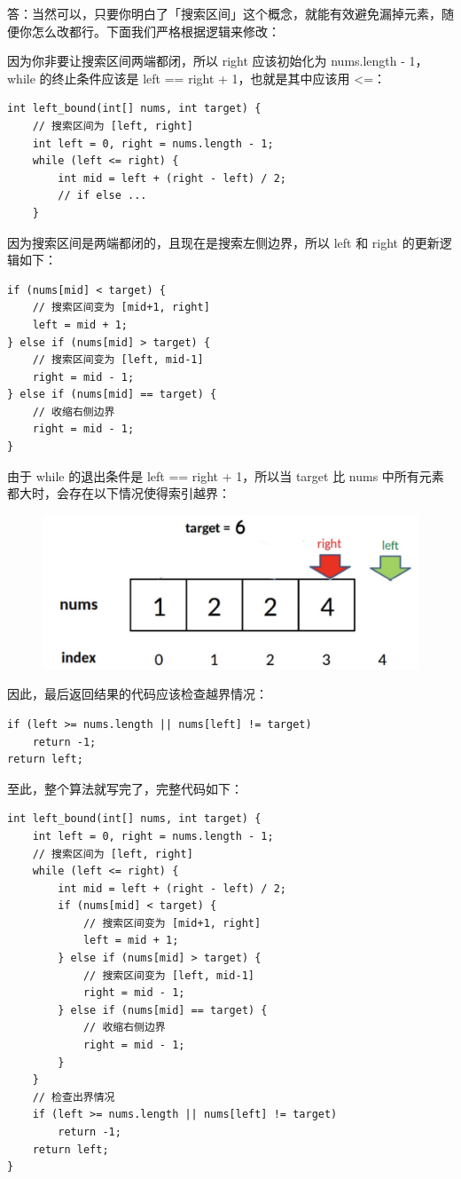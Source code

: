 \documentclass[12pt]{article}
\begin{document}
答：当然可以，只要你明白了「搜索区间」这个概念，就能有效避免漏掉元素，随便你怎么改都行。下面我们严格根据逻辑来修改：

因为你非要让搜索区间两端都闭，所以 right 应该初始化为 nums.length - 1，while 的终止条件应该是 left == right + 1，也就是其中应该用 <=：
\begin{lstlisting}
int left_bound(int[] nums, int target) {
    // 搜索区间为 [left, right]
    int left = 0, right = nums.length - 1;
    while (left <= right) {
        int mid = left + (right - left) / 2;
        // if else ...
    }
\end{lstlisting}

因为搜索区间是两端都闭的，且现在是搜索左侧边界，所以 left 和 right 的更新逻辑如下：
\begin{lstlisting}
if (nums[mid] < target) {
    // 搜索区间变为 [mid+1, right]
    left = mid + 1;
} else if (nums[mid] > target) {
    // 搜索区间变为 [left, mid-1]
    right = mid - 1;
} else if (nums[mid] == target) {
    // 收缩右侧边界
    right = mid - 1;
}
\end{lstlisting}

由于 while 的退出条件是 left == right + 1，所以当 target 比 nums 中所有元素都大时，会存在以下情况使得索引越界：
\begin{figure}[H]
    \centering
    \includegraphics[width=1\textwidth]{fig/Binary_Search_2.png}
\end{figure}

因此，最后返回结果的代码应该检查越界情况：
\begin{lstlisting}
if (left >= nums.length || nums[left] != target)
    return -1;
return left;
\end{lstlisting}

至此，整个算法就写完了，完整代码如下：
\begin{lstlisting}
int left_bound(int[] nums, int target) {
    int left = 0, right = nums.length - 1;
    // 搜索区间为 [left, right]
    while (left <= right) {
        int mid = left + (right - left) / 2;
        if (nums[mid] < target) {
            // 搜索区间变为 [mid+1, right]
            left = mid + 1;
        } else if (nums[mid] > target) {
            // 搜索区间变为 [left, mid-1]
            right = mid - 1;
        } else if (nums[mid] == target) {
            // 收缩右侧边界
            right = mid - 1;
        }
    }
    // 检查出界情况
    if (left >= nums.length || nums[left] != target)
        return -1;
    return left;
}
\end{lstlisting}
\end{document}
